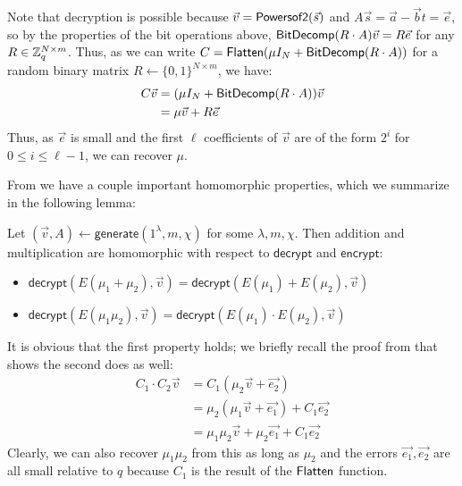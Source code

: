Note that decryption is possible because $\vec{v} = \mathsf{Powersof2}(\vec{s})$ and $A\vec{s} = \vec{a} - \vec{b}t = \vec{e}$, so by the properties of the bit operations above, $\mathsf{BitDecomp}(R\cdot A)\vec{v} = R\vec{e}$ for any $R \in \mathbb{Z}_q^{N \times m}$.  Thus, as we can write $C = \mathsf{Flatten}(\mu I_N + \mathsf{BitDecomp}(R\cdot A))$ for a random binary matrix $R \leftarrow \{0,1\}^{N\times m}$, we have:
\begin{align*}
C\vec{v} &= (\mu I_N + \mathsf{BitDecomp}(R\cdot A))\vec{v}\\
&= \mu \vec{v} + R\vec{e}
\end{align*}
Thus, as $\vec{e}$ is small and the first $\ell$ coefficients of $\vec{v}$ are of the form $2^i$ for $0 \leq i \leq \ell-1$, we can recover $\mu$.

From \cite{gsw} we have a couple important homomorphic properties, which we summarize in the following lemma:

\begin{lemma}
\label{gswprop}
Let $(\vec{v}, A) \leftarrow \mathsf{generate}(1^\lambda, m, \chi)$ for some $\lambda, m, \chi$.  Then addition and multiplication are homomorphic with respect to $\mathsf{decrypt}$ and $\mathsf{encrypt}$:
\begin{itemize}
\item $\mathsf{decrypt}(E(\mu_1 + \mu_2), \vec{v}) = \mathsf{decrypt}(E(\mu_1) + E(\mu_2), \vec{v})$
\item $\mathsf{decrypt}(E(\mu_1\mu_2), \vec{v}) = \mathsf{decrypt}(E(\mu_1)\cdot E(\mu_2), \vec{v})$
\end{itemize}
\end{lemma}

It is obvious that the first property holds; we briefly recall the proof from \cite{gsw} that shows the second does as well:
\begin{align*}
C_1\cdot C_2\vec{v} &= C_1(\mu_2\vec{v} + \vec{e_2})\\
&= \mu_2(\mu_1\vec{v} + \vec{e_1}) + C_1\vec{e_2}\\
&= \mu_1\mu_2\vec{v} + \mu_2\vec{e_1} + C_1\vec{e_2}
\end{align*}
Clearly, we can also recover $\mu_1\mu_2$ from this as long as $\mu_2$ and the errors $\vec{e_1}, \vec{e_2}$ are all small relative to $q$ because $C_1$ is the result of the $\mathsf{Flatten}$ function.
